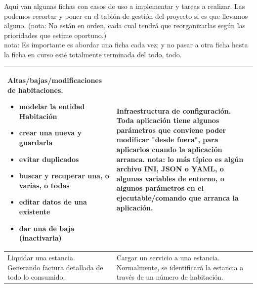 \documentclass[spanish,12pt,a4paper,final,oneside]{book}
\begin{document}
\vspace{2cm}

Aquí van algunas fichas con casos de uso a implementar y tareas a realizar. Las podemos recortar y poner en el tablón de gestión del proyecto si es que llevamos alguno. (nota: No están en orden, cada cual tendrá que reorganizarlas según las prioridades que estime oportuno.)
\\nota: Es importante es abordar una ficha cada vez; y no pasar a otra ficha hasta la ficha en curso esté totalmente terminada del todo, todo.

\def\arraystretch{2}
\begin{longtable}{|p{7cm}|p{7cm}|}

\hline

Altas/bajas/modificaciones de habitaciones. 
\newline
\begin{itemize}
\item modelar la entidad Habitación
\item crear una nueva y guardarla
\item evitar duplicados 
\item buscar y recuperar una, o varias, o todas
\item editar datos de una existente
\item dar una de baja (inactivarla)
\end{itemize}

&

Infraestructura de configuración.
\newline \newline
Toda aplicación tiene algunos parámetros que conviene poder modificar "desde fuera", para aplicarlos cuando la aplicación arranca.
\newline \newline
nota: lo más típico es algún archivo INI, JSON o YAML,
o algunas variables de entorno,
o algunos parámetros en el ejecutable/comando que arranca la aplicación.

\\ \hline

Liquidar una estancia.
\newline \newline
Generando factura detallada de todo lo consumido.

&

Cargar un servicio a una estancia.
\newline \newline
Normalmente, se identificará la estancia a través de un número de habitación.


\end{longtable}
\end{document}
